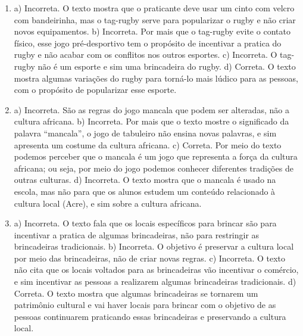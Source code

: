 \begin{enumerate}
\item
a) Incorreta. O texto mostra que o praticante deve usar um cinto com
velcro com bandeirinha, mas o tag-rugby serve para popularizar o rugby e
não criar novos equipamentos.
b) Incorreta. Por mais que o tag-rugby evite o contato físico, esse jogo
pré-desportivo tem o propósito de incentivar a pratica do rugby e não
acabar com os conflitos nos outros esportes.
c) Incorreta. O tag-rugby não é um esporte e sim uma brincadeira do
rugby.
d) Correta. O texto mostra algumas variações do rugby para torná-lo mais
lúdico para as pessoas, com o propósito de popularizar esse esporte.

\item
a) Incorreta. São as regras do jogo mancala que podem ser
alteradas, não a cultura africana.
b) Incorreta. Por mais que o texto mostre o significado da palavra
“mancala”, o jogo de tabuleiro não ensina novas palavras, e sim
apresenta um costume da cultura africana.
c) Correta. Por meio do texto podemos perceber que o mancala é um jogo
que representa a força da cultura africana; ou seja, por meio do jogo podemos conhecer diferentes tradições de outras culturas.
d) Incorreta. O texto mostra que o mancala é usado na escola, mas não
para que os alunos estudem um conteúdo relacionado à cultura local
(Acre), e sim sobre a cultura africana.

\item
a) Incorreta. O texto fala que os locais específicos para brincar são para
incentivar a pratica de algumas brincadeiras, não para restringir as
brincadeiras tradicionais.
b) Incorreta. O objetivo é preservar a cultura local por meio das
brincadeiras, não de criar novas regras.
c) Incorreta. O texto não cita que os locais voltados para as
brincadeiras vão incentivar o comércio, e sim incentivar as pessoas a
realizarem algumas brincadeiras tradicionais.
d) Correta. O texto mostra que algumas brincadeiras se tornarem um
patrimônio cultural e vai haver locais para brincar com o objetivo de
as pessoas continuarem praticando essas brincadeiras e preservando a cultura
local.
\end{enumerate}


